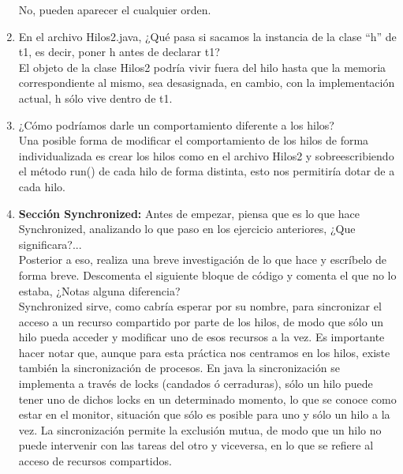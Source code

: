 \documentclass{article}
\begin{document}
\begin{enumerate}
    No, pueden aparecer el cualquier orden.
    \item En el archivo Hilos2.java, ¿Qué pasa si sacamos la instancia de la clase “h” de t1, es decir, poner h antes de declarar t1?\\
    El objeto de la clase Hilos2 podría vivir fuera del hilo hasta que la memoria correspondiente al mismo, sea desasignada, en cambio, con la implementación actual, h sólo vive dentro de t1.   
    \item ¿Cómo podríamos darle un comportamiento diferente a los hilos? \\
    Una posible forma de modificar el comportamiento de los hilos de forma individualizada es crear los hilos como en el archivo Hilos2 y sobreescribiendo el método run() de cada hilo de forma distinta, esto nos permitiría dotar de  a cada hilo.

    \item \textbf{Sección Synchronized:} Antes de empezar, piensa que es lo que hace Synchronized, analizando lo que paso en los ejercicio anteriores, ¿Que significara?... \\
    Posterior a eso, realiza una breve investigación de lo que hace y escríbelo de forma breve.
    Descomenta el siguiente bloque de código y comenta el que no lo estaba, ¿Notas alguna diferencia?\\
    Synchronized sirve, como cabría esperar por su nombre, para sincronizar el acceso a un recurso compartido por parte de los hilos, de modo que sólo un hilo pueda acceder y modificar uno de esos recursos a la vez. Es importante hacer notar que, aunque para esta práctica nos centramos en los hilos, existe también la sincronización de procesos. En java la sincronización se implementa a través de locks (candados ó cerraduras), sólo un hilo puede tener uno de dichos locks en un determinado momento, lo que se conoce como estar en el monitor, situación que sólo es posible para uno y sólo un hilo a la vez. La sincronización permite la exclusión mutua, de modo que un hilo no puede intervenir con las tareas del otro y viceversa, en lo que se refiere al acceso de recursos compartidos.
    \newpage
    

\end{enumerate}
\end{document}
